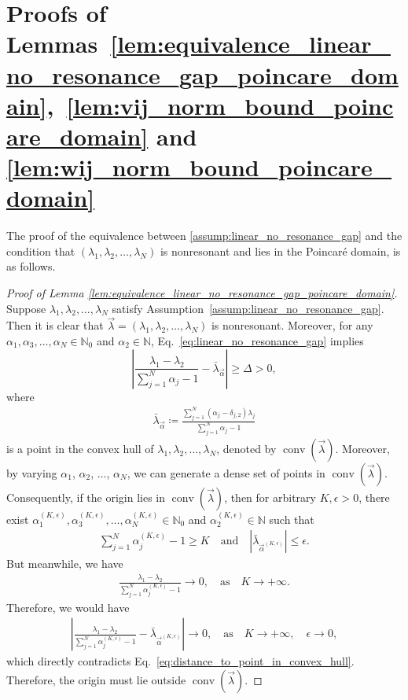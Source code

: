 \documentclass[superscriptaddress,onecolumn,nofootinbib,longbibliography,a4paper,accepted=2026-09-29]{quantumarticle}
\theoremstyle{plain}
\theoremstyle{definition}
\numberwithin{thm}{section}
\numberwithin{assumption}{section}
\numberwithin{lemma}{section}
\numberwithin{prop}{section}
\numberwithin{cor}{section}
\numberwithin{definition}{section}
\numberwithin{rmk}{section}
\numberwithin{equation}{section}
\newcommand{\abs}[1]      {\left| #1 \right|}
\newcommand{\myN}{\mathbb{N}}
\newcommand{\defeq}{\coloneqq}
\begin{document}
\section{Proofs of Lemmas~\ref{lem:equivalence_linear_no_resonance_gap_poincare_domain},~\ref{lem:vij_norm_bound_poincare_domain} and \ref{lem:wij_norm_bound_poincare_domain}}
\label{app:proof_norm_bound_vij_v_inv_ij_poincare_domain}

The proof of the equivalence between \ref{assump:linear_no_resonance_gap} and the condition that $(\lambda_1, \lambda_2, \dots, \lambda_N)$ is nonresonant and lies in the Poincar\'{e} domain, is as follows.
\begin{proof}[Proof of Lemma \ref{lem:equivalence_linear_no_resonance_gap_poincare_domain}]
Suppose $\lambda_1, \lambda_2, \dots, \lambda_N$ satisfy Assumption~\ref{assump:linear_no_resonance_gap}. Then it is clear that $\vec\lambda=(\lambda_1, \lambda_2, \dots, \lambda_N)$ is nonresonant. Moreover, for any $\alpha_1, \alpha_3, \dots, \alpha_N \in \myN_0$ and $\alpha_2 \in \myN$,  Eq.~\eqref{eq:linear_no_resonance_gap} implies
\begin{equation}
    \abs{\frac{\lambda_1-\lambda_2}{\sum_{j=1}^N \alpha_j - 1} - \bar{\lambda}_{\vec \alpha}}  \ge \Delta >0,
    \label{eq:distance_to_point_in_convex_hull}
\end{equation}
where 
\begin{align}
\bar{\lambda}_{\vec \alpha} \defeq \frac{\sum_{j=1}^N (\alpha_j - \delta_{j,2}) \lambda_j}{\sum_{j=1}^N \alpha_j - 1}    
\end{align}
is a point in the convex hull of $\lambda_1,\lambda_2,\dots,\lambda_N$, denoted by $\operatorname{conv}(\vec \lambda)$. Moreover, by varying $\alpha_1$, $\alpha_2$, $\dots$, $\alpha_N$, we can generate a dense set of points in $\operatorname{conv}(\vec \lambda)$. Consequently, if the origin lies in $\operatorname{conv}(\vec \lambda)$, then
for arbitrary $K, \epsilon>0$, there exist  $\alpha^{(K,\epsilon)}_1, \alpha^{(K,\epsilon)}_3, \dots, \alpha^{(K,\epsilon)}_N \in \myN_0$ and $\alpha^{(K,\epsilon)}_2 \in \myN$ such that
\begin{align}
\sum_{j=1}^N \alpha^{(K,\epsilon)}_j - 1 \ge K \quad \mathrm{and}\quad \abs{\bar{\lambda}_{\vec \alpha^{(K,\epsilon)}}} \le \epsilon.   
\end{align}
But meanwhile, we have 
\begin{align}
\frac{\lambda_1-\lambda_2}{\sum_{j=1}^N \alpha_j^{(K,\epsilon)} - 1} \to 0, \quad \mathrm{as}\quad K \to +\infty.    
\end{align}
Therefore, we would have
\begin{align}
\abs{\frac{\lambda_1-\lambda_2}{\sum_{j=1}^N \alpha_j^{(K,\epsilon)} - 1} - \bar{\lambda}_{\vec \alpha^{(K,\epsilon)}}} \to 0, \quad \mathrm{as}\quad K \to +\infty, \quad \epsilon \to 0,     
\end{align}
which directly contradicts Eq.~\eqref{eq:distance_to_point_in_convex_hull}. Therefore, the origin must lie outside $\operatorname{conv}(\vec \lambda)$.


\end{proof}
\end{document}
